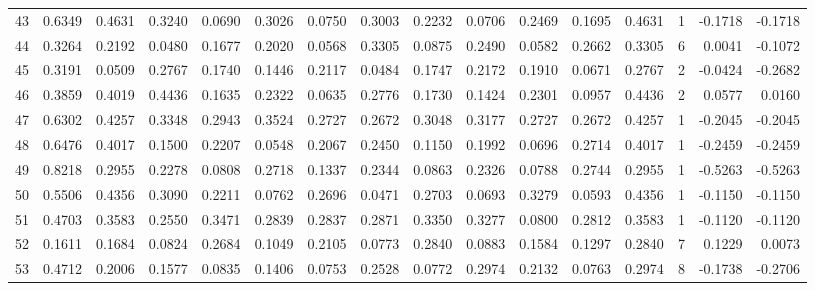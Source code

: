 \begin{tabular}{lrrrrrrrrrrrrrrr}
43  &      0.6349 &  0.4631 &  0.3240 &  0.0690 &  0.3026 &  0.0750 &  0.3003 &  0.2232 &  0.0706 &  0.2469 &   0.1695 &     0.4631 &      1 &                   -0.1718 &                    -0.1718 \\
44  &      0.3264 &  0.2192 &  0.0480 &  0.1677 &  0.2020 &  0.0568 &  0.3305 &  0.0875 &  0.2490 &  0.0582 &   0.2662 &     0.3305 &      6 &                    0.0041 &                    -0.1072 \\
45  &      0.3191 &  0.0509 &  0.2767 &  0.1740 &  0.1446 &  0.2117 &  0.0484 &  0.1747 &  0.2172 &  0.1910 &   0.0671 &     0.2767 &      2 &                   -0.0424 &                    -0.2682 \\
46  &      0.3859 &  0.4019 &  0.4436 &  0.1635 &  0.2322 &  0.0635 &  0.2776 &  0.1730 &  0.1424 &  0.2301 &   0.0957 &     0.4436 &      2 &                    0.0577 &                     0.0160 \\
47  &      0.6302 &  0.4257 &  0.3348 &  0.2943 &  0.3524 &  0.2727 &  0.2672 &  0.3048 &  0.3177 &  0.2727 &   0.2672 &     0.4257 &      1 &                   -0.2045 &                    -0.2045 \\
48  &      0.6476 &  0.4017 &  0.1500 &  0.2207 &  0.0548 &  0.2067 &  0.2450 &  0.1150 &  0.1992 &  0.0696 &   0.2714 &     0.4017 &      1 &                   -0.2459 &                    -0.2459 \\
49  &      0.8218 &  0.2955 &  0.2278 &  0.0808 &  0.2718 &  0.1337 &  0.2344 &  0.0863 &  0.2326 &  0.0788 &   0.2744 &     0.2955 &      1 &                   -0.5263 &                    -0.5263 \\
50  &      0.5506 &  0.4356 &  0.3090 &  0.2211 &  0.0762 &  0.2696 &  0.0471 &  0.2703 &  0.0693 &  0.3279 &   0.0593 &     0.4356 &      1 &                   -0.1150 &                    -0.1150 \\
51  &      0.4703 &  0.3583 &  0.2550 &  0.3471 &  0.2839 &  0.2837 &  0.2871 &  0.3350 &  0.3277 &  0.0800 &   0.2812 &     0.3583 &      1 &                   -0.1120 &                    -0.1120 \\
52  &      0.1611 &  0.1684 &  0.0824 &  0.2684 &  0.1049 &  0.2105 &  0.0773 &  0.2840 &  0.0883 &  0.1584 &   0.1297 &     0.2840 &      7 &                    0.1229 &                     0.0073 \\
53  &      0.4712 &  0.2006 &  0.1577 &  0.0835 &  0.1406 &  0.0753 &  0.2528 &  0.0772 &  0.2974 &  0.2132 &   0.0763 &     0.2974 &      8 &                   -0.1738 &                    -0.2706 \\

\end{tabular}
